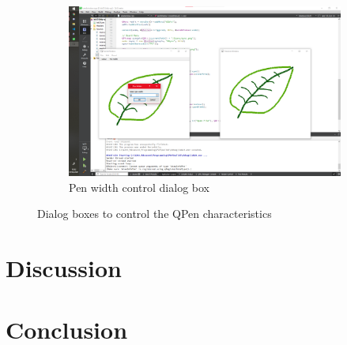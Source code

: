 \documentclass[10pt]{article}
\newcommand{\figsquish}{\vspace{-5mm}} %
\begin{document}
\begin{multicols*}{2}
\begin{figure}[H]
\begin{subfigure}[t]{0.48\columnwidth}
		\includegraphics[width=\columnwidth]{./width.png}
		\caption{Pen width control dialog box}
		\label{fig:width}
	\end{subfigure}
	\caption{Dialog boxes to control the QPen characteristics}
	\label{fig:drawDialogs}
\end{figure}
\figsquish


\section{Discussion}

\section{Conclusion}


\nocite{*} %



\end{multicols*}
\end{document}
